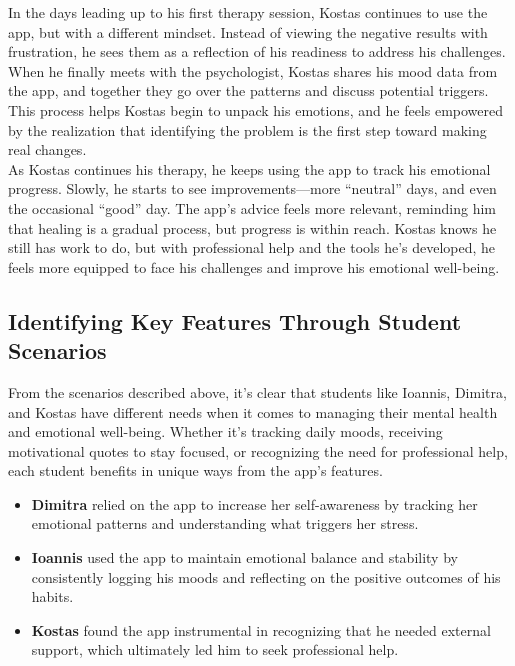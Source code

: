 In the days leading up to his first therapy session, Kostas continues to use the app, but with a different mindset. Instead of viewing the negative results with frustration, he sees them as a reflection of his readiness to address his challenges. When he finally meets with the psychologist, Kostas shares his mood data from the app, and together they go over the patterns and discuss potential triggers. This process helps Kostas begin to unpack his emotions, and he feels empowered by the realization that identifying the problem is the first step toward making real changes.\vspace{5mm} \\
As Kostas continues his therapy, he keeps using the app to track his emotional progress. Slowly, he starts to see improvements—more “neutral” days, and even the occasional “good” day. The app's advice feels more relevant, reminding him that healing is a gradual process, but progress is within reach. Kostas knows he still has work to do, but with professional help and the tools he’s developed, he feels more equipped to face his challenges and improve his emotional well-being.

\subsection{Identifying Key Features Through Student Scenarios}

From the scenarios described above, it's clear that students like Ioannis, Dimitra, and Kostas have different needs when it comes to managing their mental health and emotional well-being. Whether it's tracking daily moods, receiving motivational quotes to stay focused, or recognizing the need for professional help, each student benefits in unique ways from the app's features.

\begin{itemize}
    \item \textbf{Dimitra} relied on the app to increase her self-awareness by tracking her emotional patterns and understanding what triggers her stress.
    \item \textbf{Ioannis} used the app to maintain emotional balance and stability by consistently logging his moods and reflecting on the positive outcomes of his habits.
    \item \textbf{Kostas} found the app instrumental in recognizing that he needed external support, which ultimately led him to seek professional help. 
\end{itemize}

